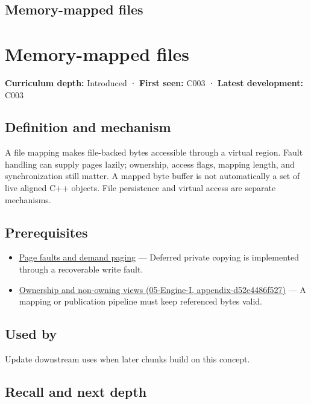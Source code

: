 \hypertarget{appendix-313ee7a0ba7b}{}
\section*{Memory-mapped files}
\chapter{Memory-mapped files}\label{appendix-313ee7a0ba7b-memory-mapped-files}

\textbf{Curriculum depth:} Introduced · \textbf{First seen:} C003 · \textbf{Latest development:} C003

\section{Definition and mechanism}\label{appendix-313ee7a0ba7b-definition-and-mechanism}

A file mapping makes file-backed bytes accessible through a virtual region. Fault handling can supply pages lazily; ownership, access flags, mapping length, and synchronization still matter. A mapped byte buffer is not automatically a set of live aligned C++ objects. File persistence and virtual access are separate mechanisms.

\section{Prerequisites}\label{appendix-313ee7a0ba7b-prerequisites}

\begin{itemize}
\tightlist
\item
  \hyperref[appendix-cc0909a7ef14]{Page faults and demand paging} --- Deferred private copying is implemented through a recoverable write fault.
\item
  \href{../05-Engine-I/main.pdf\#nameddest=appendix-d52e4486f527}{Ownership and non-owning views (05-Engine-I, appendix-d52e4486f527)} --- A mapping or publication pipeline must keep referenced bytes valid.
\end{itemize}

\section{Used by}\label{appendix-313ee7a0ba7b-used-by}

Update downstream uses when later chunks build on this concept.

\section{Recall and next depth}\label{appendix-313ee7a0ba7b-recall-and-next-depth}


